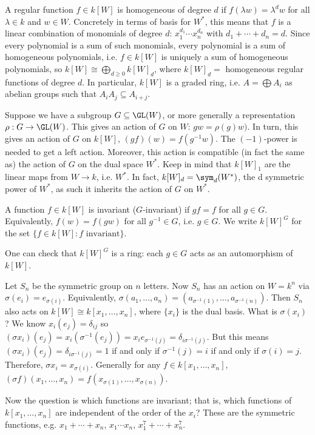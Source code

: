 A regular function $f \in k[W]$ is homogeneous of degree $d$ if $f(\lambda w)=\lambda^d w$ for all $\lambda \in k$ and $w \in W$. Concretely in terms of basis for $W^*$, this means that $f$ is a linear combination of monomials of degree $d$: $x_1^{d_1} \cdots x_n^{d_n}$ with $d_1+\cdots+d_n=d$. Since every polynomial is a sum of such monomials, every polynomial is a sum of homogeneous polynomials, i.e. $f \in k[W]$ is uniquely a sum of homogeneous polynomials, so $k[W] \cong \bigoplus_{d \geq 0} k[W]_d$, where $k[W]_d=$ homogeneous regular functions of degree $d$. In particular, $k[W]$ is a graded ring, i.e. $A= \bigoplus A_i$ as abelian groups such that $A_iA_j \subseteq A_{i+j}$. 




Suppose we have a subgroup $G \subseteq \GL(W)$, or more generally a representation $\rho: G \to \GL(W)$. This gives an action of $G$ on $W$: $gw=\rho(g)w)$. In turn, this gives an action of $G$ on $k[W]$, $(gf)(w)=f(g^{-1}w)$. The $(-1)$-power is needed to get a left action. Moreover, this action is compatible (in fact the same as) the action of $G$ on the dual space $W^*$. Keep in mind that $k[W]_1$ are the linear maps from $W \to k$, i.e. $W^*$. In fact, $k[W]_d= \sym_d(W^*)$, the d symmetric power of $W^*$, as such it inherits the action of $G$ on $W^*$. 

\begin{dfn}[Invariant]
A function $f \in k[W]$ is invariant ($G$-invariant) if $gf=f$ for all $g \in G$. Equivalently, $f(w)=f(gw)$ for all $g^{-1} \in G$, i.e. $g \in G$. We write $k[W]^G$ for the set $\{ f \in k[W] \colon f \text{ invariant}\}$.
\end{dfn}

One can check that $k[W]^G$ is a ring: each $g \in G$ acts as an automorphism of $k[W]$. 

\begin{ex}
Let $S_n$ be the symmetric group on $n$ letters. Now $S_n$ has an action on $W=k^n$ via $\sigma(e_i)=e_{\sigma(i)}$. Equivalently, $\sigma(a_1,\ldots,a_n)=(a_{\sigma^{-1}(1)}, \ldots, a_{\sigma^{-1}(n)})$. Then $S_n$ also acts on $k[W] \cong k[x_1,\ldots,x_n]$, where $\{x_i\}$ is the dual basis. What is $\sigma(x_i)$? We know $x_i(e_j)=\delta_{ij}$ so $(\sigma x_i)(e_j)=x_i(\sigma^{-1}(e_j))=x_ie_{\sigma^{-1}(j)}=\delta_{i \sigma^{-1}(j)}$. But this means $(\sigma x_i)(e_j)=\delta_{i \sigma^{-1}(j)}=1$ if and only if $\sigma^{-1}(j)=i$ if and only if $\sigma(i)=j$. Therefore, $\sigma x_i= x_{\sigma(i)}$. Generally for any $f \in k[x_1,\ldots,x_n]$, $(\sigma f)(x_1,\ldots,x_n)= f(x_{\sigma(1)},\ldots,x_{\sigma(n)})$. 

Now the question is which functions are invariant; that is, which functions of $k[x_1,\ldots,x_n]$ are independent of the order of the $x_i$? These are the symmetric functions, e.g. $x_1+\cdots+x_n$, $x_1\cdots x_n$, $x_1^7+\cdots+x_n^7$. 
\end{ex}


